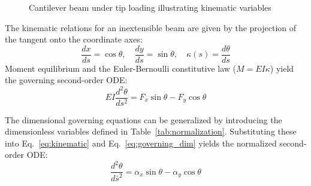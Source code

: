 \documentclass[colorlinks,upint,subscriptcorrection,varvw,hyphenate,balance]{asmeconf} %
\newcommand{\sbar}{\bar{s}}
\begin{document}
\begin{figure}[ht]
\centering
{}
\caption{Cantilever beam under tip loading illustrating kinematic variables}
\label{fig:cantilever}
\end{figure}

The kinematic relations for an inextensible beam are given by the projection of the tangent onto the coordinate axes:
\begin{equation}
\frac{dx}{ds} = \cos\theta, \quad \frac{dy}{ds} = \sin\theta, \quad \kappa(s) = \frac{d\theta}{ds}
\label{eq:kinematic}
\end{equation}
Moment equilibrium and the Euler-Bernoulli constitutive law ($M = EI\kappa$) yield the governing second-order ODE:
\begin{equation}
EI \frac{d^2\theta}{ds^2} = F_x \sin\theta - F_y \cos\theta
\label{eq:governing_dim}
\end{equation}

The dimensional governing equations can be generalized by introducing the dimensionless variables defined in Table~\ref{tab:normalization}. Substituting these into Eq.~\eqref{eq:kinematic} and Eq.~\eqref{eq:governing_dim} yields the normalized second-order ODE:
\begin{equation}
\frac{d^2\theta}{d\sbar^2} = \alpha_x \sin\theta - \alpha_y \cos\theta
\label{eq:normalized_ode}
\end{equation}
\end{document}

